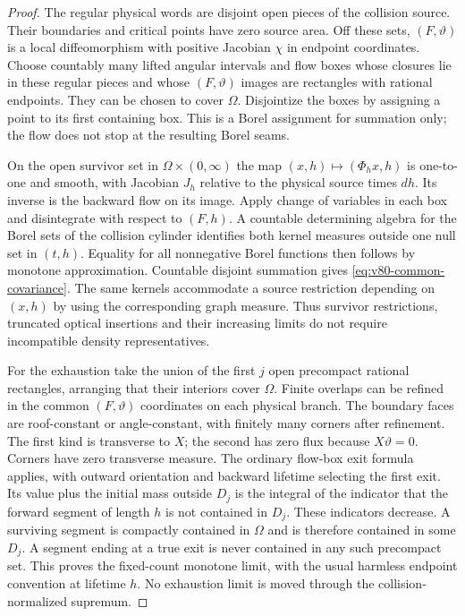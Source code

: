 \begin{proof}
The regular physical words are disjoint open pieces of the collision
source. Their boundaries and critical points have zero source area.
Off these sets, $(F,\vartheta)$ is a local diffeomorphism with positive
Jacobian $\chi$ in endpoint coordinates. Choose countably many lifted
angular intervals and flow boxes whose closures lie in these regular
pieces and whose $(F,\vartheta)$ images are rectangles with rational
endpoints. They can be chosen to cover $\Omega$. Disjointize the
boxes by assigning a point to its first containing box. This is a
Borel assignment for summation only; the flow does not stop at the
resulting Borel seams.

On the open survivor set in $\Omega\times(0,\infty)$ the map
$(x,h)\mapsto(\Phi_hx,h)$ is one-to-one and smooth, with Jacobian
$J_h$ relative to the physical source times $dh$. Its inverse is
the backward flow on its image. Apply change of variables in each
box and disintegrate with respect to $(F,h)$. A countable determining
algebra for the Borel sets of the collision cylinder identifies both
kernel measures outside one null set in $(t,h)$. Equality for all
nonnegative Borel functions then follows by monotone approximation.
Countable disjoint summation gives \eqref{eq:v80-common-covariance}.
The same kernels accommodate a source restriction depending on
$(x,h)$ by using the corresponding graph measure. Thus survivor
restrictions, truncated optical insertions and their increasing limits
do not require incompatible density representatives.

For the exhaustion take the union of the first $j$ open precompact
rational rectangles, arranging that their interiors cover $\Omega$.
Finite overlaps can be refined in the common $(F,\vartheta)$
coordinates on each physical branch. The boundary faces are
roof-constant or angle-constant, with finitely many corners after
refinement. The first kind is transverse to $X$; the second has zero
flux because $X\vartheta=0$. Corners have zero transverse measure.
The ordinary flow-box exit formula applies, with outward orientation
and backward lifetime selecting the first exit. Its value plus the
initial mass outside $D_j$ is the integral of the indicator that the
forward segment of length $h$ is not contained in $D_j$. These
indicators decrease. A surviving segment is compactly contained in
$\Omega$ and is therefore contained in some $D_j$. A segment ending
at a true exit is never contained in any such precompact set.
This proves the fixed-count monotone limit, with the usual harmless
endpoint convention at lifetime $h$. No exhaustion limit is moved
through the collision-normalized supremum.
\end{proof}

